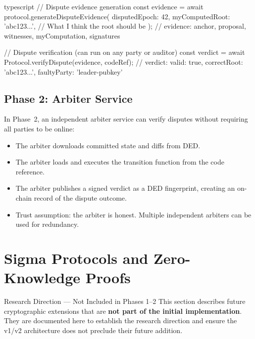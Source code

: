 \documentclass[11pt,a4paper]{article}
\begin{document}
\begin{codebox}{typescript}
// Dispute evidence generation
const evidence = await protocol.generateDisputeEvidence({
  disputedEpoch: 42,
  myComputedRoot: 'abc123...',  // What I think the root should be
});
// evidence: { anchor, proposal, witnesses, myComputation, signatures }

// Dispute verification (can run on any party or auditor)
const verdict = await Protocol.verifyDispute(evidence, codeRef);
// verdict: { valid: true, correctRoot: 'abc123...', faultyParty: 'leader-pubkey' }
\end{codebox}

\subsection{Phase 2: Arbiter Service}

In Phase~2, an independent arbiter service can verify disputes without
requiring all parties to be online:

\begin{itemize}[nosep]
  \item The arbiter downloads committed state and diffs from DED.
  \item The arbiter loads and executes the transition function from the code
    reference.
  \item The arbiter publishes a signed verdict as a DED fingerprint, creating
    an on-chain record of the dispute outcome.
  \item Trust assumption: the arbiter is honest. Multiple independent arbiters
    can be used for redundancy.
\end{itemize}


\section{Sigma Protocols and Zero-Knowledge Proofs}
\label{sec:sigma}

\begin{researchbox}{Research Direction --- Not Included in Phases 1--2}
This section describes future cryptographic extensions that are
\textbf{not part of the initial implementation}. They are documented here
to establish the research direction and ensure the v1/v2 architecture does
not preclude their future addition.
\end{researchbox}
\end{document}
